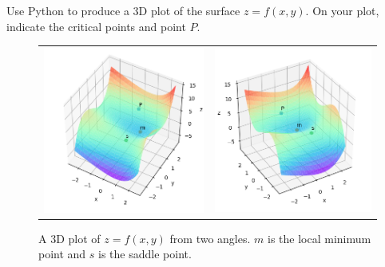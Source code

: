 \documentclass[a4paper]{article}
\begin{document}
\newpage
\subsection{~} %

\begin{questionbody}
Use Python to produce a 3D plot of the surface $z = f(x, y)$. On your plot, indicate the critical points and point $P$.
\end{questionbody}

\begin{figure}[h]
	\centering
	\begin{tabular}{cc}
		\includegraphics[scale=0.6]{Q2d-1} &
		\includegraphics[scale=0.6]{Q2d-2}
	\end{tabular}
	\caption{A 3D plot of $z=f(x,y)$ from two angles. $m$ is the local minimum point and $s$ is the saddle point.}
	\label{fig:3d-plot}
\end{figure}
\end{document}
